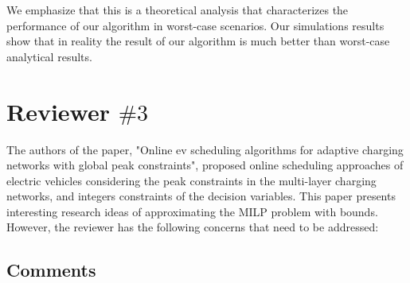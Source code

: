 \documentclass[11pt]{article}
\begin{document}
We emphasize that this is a theoretical analysis that characterizes the performance of our algorithm in worst-case scenarios. Our simulations results show that in reality the result of our algorithm is much better than worst-case analytical results. 



\newpage
\section{Reviewer $\# 3$}
{\color{blue}}
%

{\color{blue}The authors of the paper, "Online ev scheduling algorithms for adaptive charging networks with global peak constraints", proposed online scheduling approaches of electric vehicles considering the peak constraints in the multi-layer charging networks, and integers constraints of the decision variables. This paper presents interesting research ideas of approximating the MILP problem with bounds. However, the reviewer has the following concerns that need to be addressed:}

\subsection{Comments}
\end{document}
